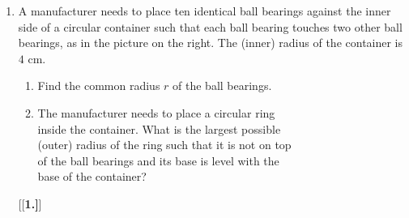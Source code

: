 {\begin{enumerate}[\bfseries 1.]
 \begin{enumerate}[\bfseries (a)]
  \item Explain why $\angle\,PAQ=30\Degrees$. (\emph{Hint: What is the supplement of $60\Degrees$?})
  \item Explain why $\angle\,PBQ=15\Degrees$ and $\angle\,PCQ=7.5\Degrees$.
  \item Use Figure \ref{fig:semicircles} to find the exact values of $\sin\;15\Degrees$,
   $\cos\;15\Degrees$,
   and $\tan\;15\Degrees$. (\emph{Hint: To start, you will need to use $\angle\,POQ = 60\Degrees$
   and $OP = 1$ to find the exact lengths of $\overline{PQ}$ and $\overline{OQ}$.})
  \item Use Figure \ref{fig:semicircles} to calculate the exact value of $\tan\;7.5\Degrees$.
  \item Use the same method but with an initial angle of $\angle\,POQ = 45\Degrees$ to find the
   exact values of $\sin\;22.5\Degrees$, $\cos\;22.5\Degrees$, and $\tan\;22.5\Degrees$.
 \end{enumerate}
\newpage
{}
\item A manufacturer needs to place ten identical ball bearings against the inner side of a circular
 container such that each ball bearing touches two other ball bearings, as in the picture on the
 right. The (inner) radius of the container is $4$ cm.
 \begin{enumerate}[\bfseries (a)]
  \item Find the common radius $r$ of the ball bearings.
  \item The manufacturer needs to place a circular ring\\inside the container. What is the largest
  possible\\(outer) radius of the ring such that it is not on top\\of the ball bearings and its base
  is level with the\\base of the container?
 \end{enumerate}
[{[\bfseries 1.]}]

\end{enumerate}}
